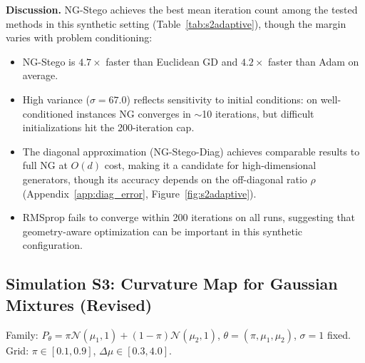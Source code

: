 \documentclass[a4paper,fleqn]{cas-dc}
\begin{document}
\textbf{Discussion.}
NG-Stego achieves the best mean iteration count among the tested methods
in this synthetic setting (Table~\ref{tab:s2adaptive}),
though the margin varies with problem conditioning:
\begin{itemize}
  \item NG-Stego is $\mathbf{4.7\times}$ faster than Euclidean GD and
        $\mathbf{4.2\times}$ faster than Adam on average.
  \item High variance ($\sigma = 67.0$) reflects sensitivity to initial
        conditions: on well-conditioned instances NG converges in $\sim$10
        iterations, but difficult initializations hit the 200-iteration cap.
  \item The diagonal approximation (NG-Stego-Diag) achieves comparable
        results to full NG at $O(d)$ cost, making it a candidate for
        high-dimensional generators, though its accuracy depends on the
        off-diagonal ratio $\rho$ (Appendix~\ref{app:diag_error},
        Figure~\ref{fig:s2adaptive}).
  \item RMSprop fails to converge within 200 iterations on all runs, suggesting that geometry-aware optimization can be important in this
synthetic configuration.
\end{itemize}

\subsection{Simulation S3: Curvature Map for Gaussian Mixtures (Revised)}
\label{sec:sim_s3}

Family: $P_\theta=\pi\mathcal{N}(\mu_1,1)+(1{-}\pi)\mathcal{N}(\mu_2,1)$,
$\theta=(\pi,\mu_1,\mu_2)$, $\sigma=1$ fixed.
Grid: $\pi\in[0.1,0.9]$, $\Delta\mu\in[0.3,4.0]$.
\end{document}
